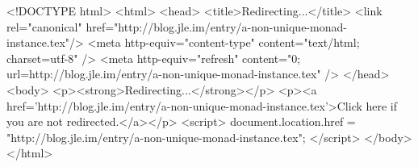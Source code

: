 <!DOCTYPE html>
<html>
<head>
<title>Redirecting...</title>
<link rel="canonical" href="http://blog.jle.im/entry/a-non-unique-monad-instance.tex"/>
<meta http-equiv="content-type" content="text/html; charset=utf-8" />
<meta http-equiv="refresh" content="0; url=http://blog.jle.im/entry/a-non-unique-monad-instance.tex" />
</head>
<body>
  <p><strong>Redirecting...</strong></p>
  <p><a href='http://blog.jle.im/entry/a-non-unique-monad-instance.tex'>Click here if you are not redirected.</a></p>
  <script>
    document.location.href = "http://blog.jle.im/entry/a-non-unique-monad-instance.tex";
  </script>
</body>
</html>
